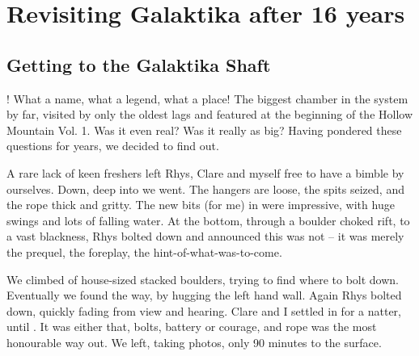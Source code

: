 
\begin{marginfigure}
\end{marginfigure}

\section{Revisiting Galaktika after 16 years}

\subsection{Getting to the Galaktika Shaft}

! What a name, what a legend, what a place! The biggest chamber in the system by far, visited by only the oldest lags and featured at the beginning of the Hollow Mountain Vol. 1. Was it even real? Was it really as big? Having pondered these questions for years, we decided to find out.

A rare lack of keen freshers left Rhys, Clare and myself free to have a bimble by ourselves. Down, deep into  we went. The hangers are loose, the spits seized, and the rope thick and gritty.
The new bits (for me) in  were impressive, with huge swings and lots of falling water. At the bottom, through a boulder choked rift, to a vast blackness, Rhys bolted down and announced this was not  – it was merely the prequel, the foreplay, the hint-of-what-was-to-come.

We climbed of house-sized stacked boulders, trying to find where to bolt down. Eventually we found the way, by hugging the left hand wall. Again Rhys bolted down, quickly fading from view and hearing. Clare and I settled in for a natter, until .  It was either that, bolts, battery or courage, and rope was the most honourable way out. We left, taking photos, only 90 minutes to the surface.

